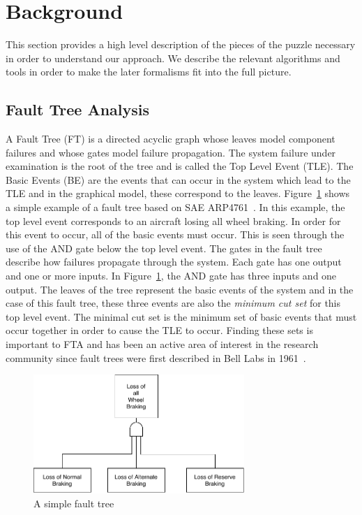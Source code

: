 \section{Background}

This section provides a high level description of the pieces of the puzzle necessary in order to understand our approach. We describe the relevant algorithms and tools in order to make the later formalisms fit into the full picture. 

\subsection{Fault Tree Analysis} A Fault Tree (FT) is a directed acyclic graph whose leaves model component failures and whose gates model failure propagation. The system failure under examination is the root of the tree and is called the Top Level Event (TLE). The Basic Events (BE) are the events that can occur in the system which lead to the TLE and in the graphical model, these correspond to the leaves. Figure~\ref{fig:introFT} shows a simple example of a fault tree based on SAE ARP4761~\cite{SAE:ARP4761}. In this example, the top level event corresponds to an aircraft losing all wheel braking. In order for this event to occur, all of the basic events must occur. This is seen through the use of the AND gate below the top level event. The gates in the fault tree describe how failures propagate through the system. Each gate has one output and one or more inputs. In Figure~\ref{fig:introFT}, the AND gate has three inputs and one output. The leaves of the tree represent the basic events of the system and in the case of this fault tree, these three events are also the \textit{minimum cut set} for this top level event. The minimal cut set is the minimum set of basic events that must occur together in order to cause the TLE to occur. Finding these sets is important to FTA and has been an active area of interest in the research community since fault trees were first described in Bell Labs in 1961~\cite{historyFTA}. 

\begin{figure}[h]
\begin{center}
\includegraphics[width=8cm]{images/introFT2.pdf}
\caption{A simple fault tree} \label{fig:introFT}
\end{center}
\end{figure}

